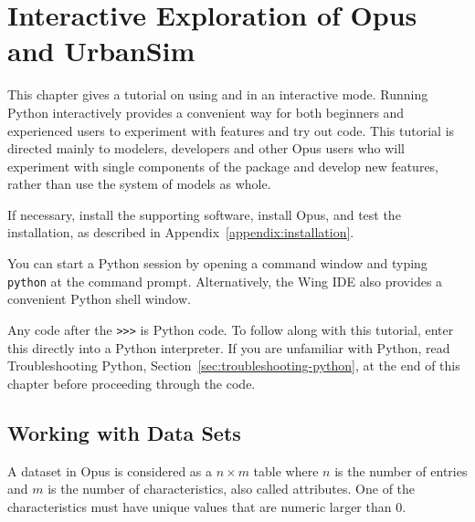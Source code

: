 
\chapter{Interactive Exploration of Opus and UrbanSim}
\label{chapter:urbansim-package-tutorial}

This chapter gives a tutorial on using  and  in an interactive mode.
Running Python interactively provides a convenient way for both beginners
and experienced users to experiment with features and try out code.  This
tutorial is directed mainly to modelers, developers and other Opus users
who will experiment with single components of the package and develop new
features, rather than use the system of models as whole.

If necessary, install the supporting software, install Opus, and test
the installation, as described in Appendix~\ref{appendix:installation}.

You can start a Python session by opening a command window and
typing \verb|python| at the command prompt. Alternatively, the
Wing IDE  
 also provides a convenient Python shell window.

Any code after the \verb|>>>| is Python code.  To follow along with this
tutorial, enter this directly into a Python interpreter.  If you are unfamiliar
with Python, read Troubleshooting Python,
Section~\ref{sec:troubleshooting-python}, at the end of this chapter before
proceeding through the code.

\section{Working with Data Sets}
\label{sec:datasets}

A dataset in Opus is considered as a $n \times m$ table where $n$ is the
number of entries and $m$ is the number of characteristics,  also called
attributes.  One of the characteristics must have unique values
that are numeric larger than 0.

